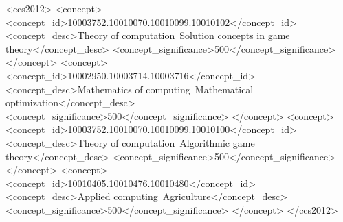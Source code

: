 \documentclass[manuscript, screen, review, anonymous]{acmart}
\begin{document}
\begin{CCSXML}
<ccs2012>
   <concept>
       <concept_id>10003752.10010070.10010099.10010102</concept_id>
       <concept_desc>Theory of computation~Solution concepts in game theory</concept_desc>
       <concept_significance>500</concept_significance>
       </concept>
   <concept>
       <concept_id>10002950.10003714.10003716</concept_id>
       <concept_desc>Mathematics of computing~Mathematical optimization</concept_desc>
       <concept_significance>500</concept_significance>
       </concept>
   <concept>
       <concept_id>10003752.10010070.10010099.10010100</concept_id>
       <concept_desc>Theory of computation~Algorithmic game theory</concept_desc>
       <concept_significance>500</concept_significance>
       </concept>
   <concept>
       <concept_id>10010405.10010476.10010480</concept_id>
       <concept_desc>Applied computing~Agriculture</concept_desc>
       <concept_significance>500</concept_significance>
       </concept>
 </ccs2012>
\end{CCSXML}

\keywords{}


\maketitle
\end{document}
